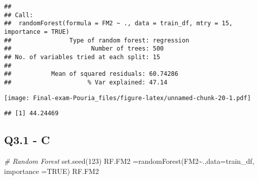 \documentclass[
]{article}
\newenvironment{Shaded}{\begin{snugshade}}{\end{snugshade}}
\newcommand{\AttributeTok}[1]{\textcolor[rgb]{0.77,0.63,0.00}{#1}}
\newcommand{\CommentTok}[1]{\textcolor[rgb]{0.56,0.35,0.01}{\textit{#1}}}
\newcommand{\ConstantTok}[1]{\textcolor[rgb]{0.00,0.00,0.00}{#1}}
\newcommand{\DecValTok}[1]{\textcolor[rgb]{0.00,0.00,0.81}{#1}}
\newcommand{\FunctionTok}[1]{\textcolor[rgb]{0.00,0.00,0.00}{#1}}
\newcommand{\NormalTok}[1]{#1}
\newcommand{\OtherTok}[1]{\textcolor[rgb]{0.56,0.35,0.01}{#1}}
\newcommand{\SpecialCharTok}[1]{\textcolor[rgb]{0.00,0.00,0.00}{#1}}
\begin{document}
\begin{verbatim}
## 
## Call:
##  randomForest(formula = FM2 ~ ., data = train_df, mtry = 15, importance = TRUE) 
##                Type of random forest: regression
##                      Number of trees: 500
## No. of variables tried at each split: 15
## 
##           Mean of squared residuals: 60.74286
##                     % Var explained: 47.14
\end{verbatim}

\begin{Shaded}
\end{Shaded}

\texttt{[image: Final-exam-Pouria\_files/figure-latex/unnamed-chunk-20-1.pdf]}

\begin{Shaded}
\end{Shaded}

\begin{verbatim}
## [1] 44.24469
\end{verbatim}

\hypertarget{q3.1---c}{%
\subsection{Q3.1 - C}\label{q3.1---c}}

\begin{Shaded}
\begin{Highlighting}[]
\CommentTok{\# Random Forest}
\FunctionTok{set.seed}\NormalTok{(}\DecValTok{123}\NormalTok{)}
\NormalTok{RF.FM2 }\OtherTok{=}\FunctionTok{randomForest}\NormalTok{(FM2}\SpecialCharTok{\textasciitilde{}}\NormalTok{.,}\AttributeTok{data=}\NormalTok{train\_df, }\AttributeTok{importance =}\ConstantTok{TRUE}\NormalTok{)}
\NormalTok{RF.FM2}
\end{Highlighting}
\end{Shaded}
\end{document}
